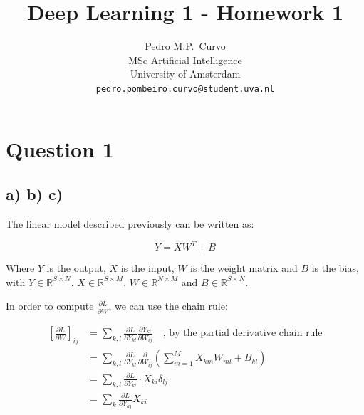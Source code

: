 \documentclass{article}
\title{Deep Learning 1 - Homework 1}
\author{%
  Pedro M.P.~Curvo \\
  MSc Artificial Intelligence\\
  University of Amsterdam\\
  \texttt{pedro.pombeiro.curvo@student.uva.nl} \\
}
\begin{document}
\maketitle




\section*{Question 1}

\subsection*{a) b) c)}

The linear model described previously can be written as:

\begin{equation}
    Y = X W^T + B
\end{equation}

Where $Y$ is the output, $X$ is the input, $W$ is the weight matrix and $B$ is the bias, with
$Y \in \mathbb{R}^{S \times N}$, $X \in \mathbb{R}^{S \times M}$, $W \in \mathbb{R}^{N \times M}$ and $B \in \mathbb{R}^{S \times N}$.

In order to compute $\frac{\partial L}{\partial W}$, we can use the chain rule:

\begin{align*}
    \left[ \frac{\partial L}{\partial W} \right]_{ij} &= \sum_{k, l} \frac{\partial L}{\partial Y_{kl}} \frac{\partial Y_{kl}}{\partial W_{ij}} \quad \text{, by the partial derivative chain rule} \\
    &= \sum_{k, l} \frac{\partial L}{\partial Y_{kl}} \frac{\partial}{\partial W_{ij}} \left( \sum_{m=1}^{M} X_{km} W_{ml} + B_{kl} \right) \\
    &= \sum_{k, l} \frac{\partial L}{\partial Y_{kl}} \cdot X_{ki} \delta_{lj} \\
    &= \sum_{k} \frac{\partial L}{\partial Y_{kj}} X_{ki} \\
\end{align*}
\end{document}
